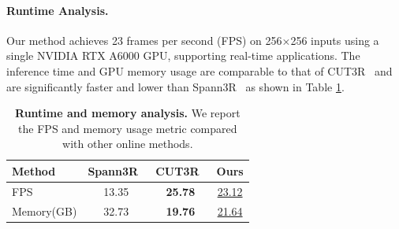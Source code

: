 \paragraph{Runtime Analysis.}
Our method achieves 23 frames per second (FPS) on 256×256 inputs using a single NVIDIA RTX A6000 GPU, supporting real-time applications. The inference time and GPU memory usage are comparable to that of CUT3R~\cite{wang2025continuous} and are significantly faster and lower than Spann3R~\cite{wang20243d} as shown in Table \ref{tab:runtime}.

\begin{table}[t]
	\centering
    \small
	\caption{\textbf{Runtime and memory analysis.} We report the FPS and memory usage metric compared with other online methods.}
    \begin{tabular}{l|ccc}
		\toprule
		  Method & Spann3R~\cite{wang20243d} & CUT3R~\cite{wang2025continuous} & \textbf{Ours} \\
        \midrule
        FPS & 13.35  & \textbf{25.78} & \underline{23.12} \\
        Memory(GB)&32.73&\textbf{19.76}&\underline{21.64}\\
		\bottomrule
	\end{tabular}
    \label{tab:runtime}
\end{table}

